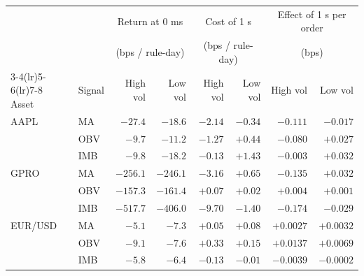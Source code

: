 \begin{tabular}{llrrrrrr}
\toprule
 & & \multicolumn{2}{c}{Return at 0 ms} & \multicolumn{2}{c}{Cost of 1 s} & \multicolumn{2}{c}{Effect of 1 s per order} \\
 & & \multicolumn{2}{c}{(bps / rule-day)} & \multicolumn{2}{c}{(bps / rule-day)} & \multicolumn{2}{c}{(bps)} \\
\cmidrule(lr){3-4}\cmidrule(lr){5-6}\cmidrule(lr){7-8}
Asset & Signal & High vol & Low vol & High vol & Low vol & High vol & Low vol \\
\midrule
AAPL & MA & $-27.4$ & $-18.6$ & $-2.14$ & $-0.34$ & $-0.111$ & $-0.017$ \\
 & OBV & $-9.7$ & $-11.2$ & $-1.27$ & $+0.44$ & $-0.080$ & $+0.027$ \\
 & IMB & $-9.8$ & $-18.2$ & $-0.13$ & $+1.43$ & $-0.003$ & $+0.032$ \\
\midrule
GPRO & MA & $-256.1$ & $-246.1$ & $-3.16$ & $+0.65$ & $-0.135$ & $+0.032$ \\
 & OBV & $-157.3$ & $-161.4$ & $+0.07$ & $+0.02$ & $+0.004$ & $+0.001$ \\
 & IMB & $-517.7$ & $-406.0$ & $-9.70$ & $-1.40$ & $-0.174$ & $-0.029$ \\
\midrule
EUR/USD & MA & $-5.1$ & $-7.3$ & $+0.05$ & $+0.08$ & $+0.0027$ & $+0.0032$ \\
 & OBV & $-9.1$ & $-7.6$ & $+0.33$ & $+0.15$ & $+0.0137$ & $+0.0069$ \\
 & IMB & $-5.8$ & $-6.4$ & $-0.13$ & $-0.01$ & $-0.0039$ & $-0.0002$ \\
\bottomrule
\end{tabular}

